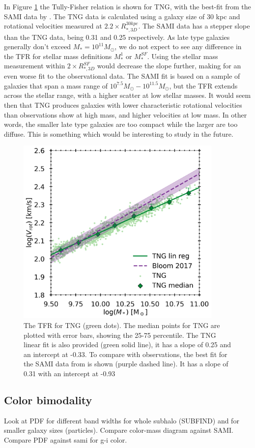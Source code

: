 In Figure \ref{TFR} the Tully-Fisher relation is shown for TNG, with the best-fit from the SAMI data by \textcite{Bloom2017}. The TNG data is calculated using a galaxy size of 30 kpc and rotational velocities measured at $2.2 \times R_{*, 3D}^{30kpc}$. The SAMI data has a stepper slope than the TNG data, being 0.31 and 0.25 respectively. As late type galaxies generally don't exceed $M_* = 10^{11} M_{\odot}$, we do not expect to see any difference in the TFR for stellar mass definitions $M_*^1$ or $M_*^{SF}$. Using the stellar mass measurement within $2 \times R_{*, 3D}^{SF}$ would decrease the slope further, making for an even worse fit to the observational data. The SAMI fit is based on a sample of galaxies that span a mass range of $10^{7.5} M_{\odot} - 10^{11.5} M_{\odot}$, but the TFR extends across the stellar range, with a higher scatter at low stellar masses. It would seem then that TNG produces galaxies with lower characteristic rotational velocities than observations show at high mass, and higher velocities at low mass. In other words, the smaller late type galaxies are too compact while the larger are too diffuse. This is something which would be interesting to study in the future.

\begin{figure}
    \centering
    \includegraphics[width=0.9\textwidth]{images/TFR.png}
    \caption{The TFR for TNG (green dots). The median points for TNG are plotted with error bars, showing the 25-75 percentile. The TNG linear fit is also provided (green solid line), it has a slope of 0.25 and an intercept at -0.33. To compare with observations, the best fit for the SAMI data from \textcite{Bloom2017} is shown (purple dashed line). It has a slope of 0.31 with an intercept at -0.93 }
    \label{TFR}
\end{figure}

\subsection{Color bimodality}

Look at PDF for different band widths for whole subhalo (SUBFIND) and for smaller galaxy sizes (particles).
Compare color-mass diagram against SAMI.
Compare PDF against sami for g-i color.


